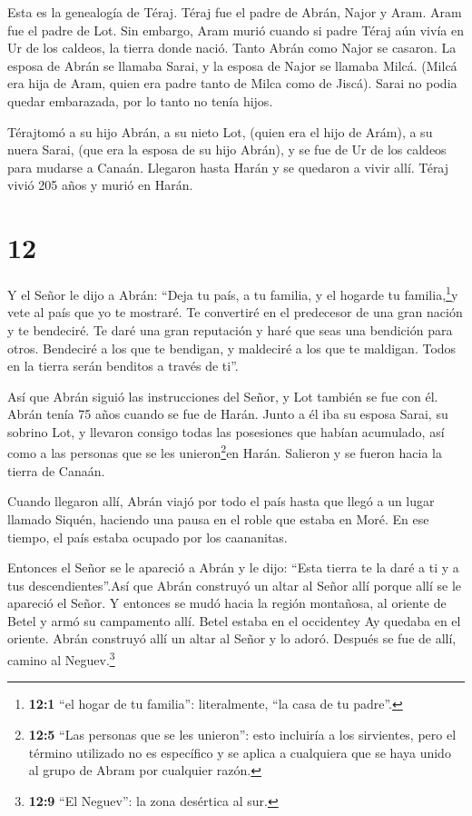  Esta es la genealogía de Téraj. Téraj fue el padre de
Abrán, Najor y Aram. Aram fue el padre de Lot.  Sin
embargo, Aram murió cuando si padre Téraj aún vivía en Ur de los
caldeos, la tierra donde nació.  Tanto Abrán como Najor se
casaron. La esposa de Abrán se llamaba Sarai, y la esposa de Najor se
llamaba Milcá. (Milcá era hija de Aram, quien era padre tanto de Milca
como de Jiscá).  Sarai no podia quedar embarazada, por lo
tanto no tenía hijos.

 Térajtomó a su hijo Abrán, a su nieto Lot, (quien era el
hijo de Arám), a su nuera Sarai, (que era la esposa de su hijo Abrán), y
se fue de Ur de los caldeos para mudarse a Canaán. Llegaron hasta Harán
y se quedaron a vivir allí.  Téraj vivió 205 años y murió
en Harán.

\hypertarget{section-11}{%
\section{12}\label{section-11}}

 Y el Señor le dijo a Abrán: ``Deja tu país, a tu familia, y
el hogarde tu familia,\footnote{\textbf{12:1} ``el hogar de tu
  familia'': literalmente, ``la casa de tu padre''.}y vete al país que
yo te mostraré.  Te convertiré en el predecesor de una gran
nación y te bendeciré. Te daré una gran reputación y haré que seas una
bendición para otros.  Bendeciré a los que te bendigan, y
maldeciré a los que te maldigan. Todos en la tierra serán benditos a
través de ti''.

 Así que Abrán siguió las instrucciones del Señor, y Lot
también se fue con él. Abrán tenía 75 años cuando se fue de Harán.
 Junto a él iba su esposa Sarai, su sobrino Lot, y llevaron
consigo todas las posesiones que habían acumulado, así como a las
personas que se les unieron\footnote{\textbf{12:5} ``Las personas que se
  les unieron'': esto incluiría a los sirvientes, pero el término
  utilizado no es específico y se aplica a cualquiera que se haya unido
  al grupo de Abram por cualquier razón.}en Harán. Salieron y se fueron
hacia la tierra de Canaán.

Cuando llegaron allí,  Abrán viajó por todo el país hasta
que llegó a un lugar llamado Siquén, haciendo una pausa en el roble que
estaba en Moré. En ese tiempo, el país estaba ocupado por los
caananitas.

 Entonces el Señor se le apareció a Abrán y le dijo: ``Esta
tierra te la daré a ti y a tus descendientes''.Así que Abrán construyó
un altar al Señor allí porque allí se le apareció el Señor. 
Y entonces se mudó hacia la región montañosa, al oriente de Betel y armó
su campamento allí. Betel estaba en el occidentey Ay quedaba en el
oriente. Abrán construyó allí un altar al Señor y lo adoró. 
Después se fue de allí, camino al Neguev.\footnote{\textbf{12:9} ``El
  Neguev'': la zona desértica al sur.}

